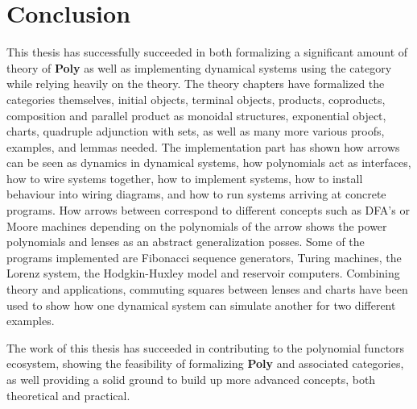 \chapter{Conclusion}\label{chapter:conclusion}
This thesis has successfully succeeded in both formalizing a significant amount of theory of \textbf{Poly} as well as implementing dynamical systems using the category while relying heavily on the theory. The theory chapters have formalized the categories themselves, initial objects, terminal objects, products, coproducts, composition and parallel product as monoidal structures, exponential object, charts, quadruple adjunction with sets, as well as many more various proofs, examples, and lemmas needed. 
 The implementation part has shown how arrows can be seen as dynamics in dynamical systems, how polynomials act as interfaces, how to wire systems together, how to implement systems, how to install behaviour into wiring diagrams, and how to run systems arriving at concrete programs. How arrows between correspond to different concepts such as DFA's or Moore machines depending on the polynomials of the arrow shows the power polynomials and lenses as an abstract generalization posses. Some of the programs implemented are Fibonacci sequence generators, Turing machines, the Lorenz system, the Hodgkin-Huxley model and reservoir computers. Combining theory and applications, commuting squares between lenses and charts have been used to show how one dynamical system can simulate another for two different examples.

The work of this thesis has succeeded in contributing to the polynomial functors ecosystem, showing the feasibility of formalizing \textbf{Poly} and associated categories, as well providing a solid ground to build up more advanced concepts, both theoretical and practical. 
